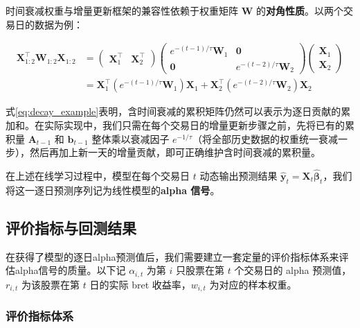 \documentclass{article}
\begin{document}
时间衰减权重与增量更新框架的兼容性依赖于权重矩阵 $\mathbf{W}$ 的\textbf{对角性质}。以两个交易日的数据为例：

\begin{equation}
\begin{split}
    \mathbf{X}_{1:2}^{\top} \mathbf{W}_{1:2} \mathbf{X}_{1:2} &=
    \begin{pmatrix} \mathbf{X}_1^{\top} & \mathbf{X}_2^{\top} \end{pmatrix}
    \begin{pmatrix} e^{-(t-1)/\tau} \mathbf{W}_1 & \mathbf{0} \\ \mathbf{0} & e^{-(t-2)/\tau} \mathbf{W}_2 \end{pmatrix}
    \begin{pmatrix} \mathbf{X}_1 \\ \mathbf{X}_2 \end{pmatrix} \\
    &= \mathbf{X}_1^{\top} \!\left(e^{-(t-1)/\tau} \mathbf{W}_1\right) \mathbf{X}_1 + \mathbf{X}_2^{\top} \!\left(e^{-(t-2)/\tau} \mathbf{W}_2\right) \mathbf{X}_2
\end{split}
    \label{eq:decay_example}
\end{equation}

\noindent 式\ref{eq:decay_example}表明，含时间衰减的累积矩阵仍然可以表示为逐日贡献的累加和。在实际实现中，我们只需在每个交易日的增量更新步骤之前，先将已有的累积量 $\mathbf{A}_{t-1}$ 和 $\mathbf{b}_{t-1}$ 整体乘以衰减因子 $e^{-1/\tau}$（将全部历史数据的权重统一衰减一步），然后再加上新一天的增量贡献，即可正确维护含时间衰减的累积量。

在上述在线学习过程中，模型在每个交易日 $t$ 动态输出预测结果 $\hat{\mathbf{y}}_t = \mathbf{X}_t \hat{\boldsymbol{\beta}}_t$，我们将这一逐日预测序列记为线性模型的\textbf{alpha 信号}。

\subsection{评价指标与回测结果}
\label{sec:evaluation}

在获得了模型的逐日alpha预测值后，我们需要建立一套定量的评价指标体系来评估alpha信号的质量。以下记 $\alpha_{i,t}$ 为第 $i$ 只股票在第 $t$ 个交易日的 alpha 预测值，$r_{i,t}$ 为该股票在第 $t$ 日的实际 bret 收益率，$w_{i,t}$ 为对应的样本权重。

\subsubsection{评价指标体系}
\end{document}
